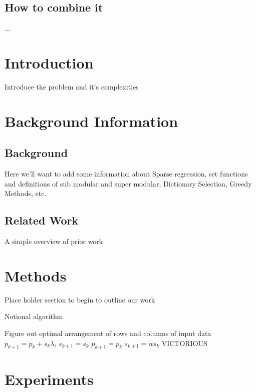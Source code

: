 \documentclass{article}
\begin{document}
\subsection{How to combine it}
...
\section{Introduction} \label{introduction}
Introduce the problem and it's complexities

\section{Background Information} \label{background}
\subsection{Background}
Here we'll want to add some information about Sparse regression, set functions and definitions of sub modular and super modular, Dictionary Selection, Greedy Methods, etc.

\subsection{Related Work}
A simple overview of prior work


\section{Methods} \label{methods}

Place holder section to begin to outline our work

\begin{algorithm}
  \caption{Notional algorithm}
  \label{alg:compass}
\begin{algorithmic}
  \STATE  Figure out optimal arrangement of rows and columns of input data
  \STATE $p_{k+1} = p_k + s_k\lambda_i$
  \STATE $s_{k+1} = s_k$
  \ELSE
  \STATE $p_{k+1} = p_{k}$
  \STATE $s_{k+1} = \alpha s_k$
  \ENDIF
  \ENDWHILE
  \RETURN VICTORIOUS
\end{algorithmic}
\end{algorithm}

\section{Experiments} \label{experiments}
\end{document}
